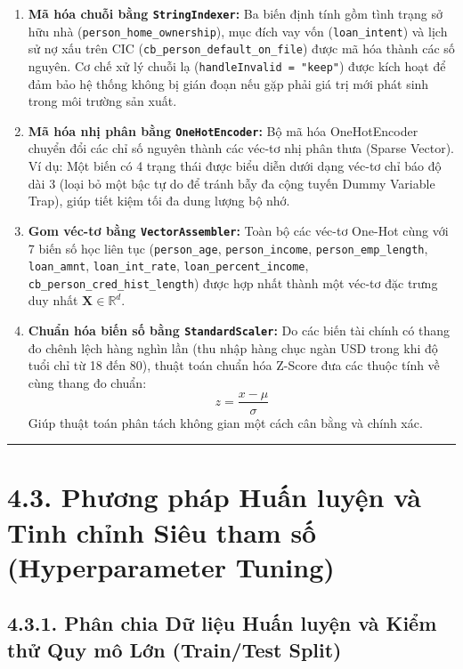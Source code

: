 \documentclass[
  13pt,
  a4paper,
]{report}
\providecommand{\tightlist}{%
  \setlength{\itemsep}{0pt}\setlength{\parskip}{0pt}}
\begin{document}
\begin{enumerate}
\def\labelenumi{\arabic{enumi}.}
\tightlist
\item
  \textbf{Mã hóa chuỗi bằng \texttt{StringIndexer}:} Ba biến định tính
  gồm tình trạng sở hữu nhà (\texttt{person\_home\_ownership}), mục đích
  vay vốn (\texttt{loan\_intent}) và lịch sử nợ xấu trên CIC
  (\texttt{cb\_person\_default\_on\_file}) được mã hóa thành các số
  nguyên. Cơ chế xử lý chuỗi lạ (\texttt{handleInvalid\ =\ "keep"}) được
  kích hoạt để đảm bảo hệ thống không bị gián đoạn nếu gặp phải giá trị
  mới phát sinh trong môi trường sản xuất.
\item
  \textbf{Mã hóa nhị phân bằng \texttt{OneHotEncoder}:} Bộ mã hóa
  OneHotEncoder chuyển đổi các chỉ số nguyên thành các véc-tơ nhị phân
  thưa (Sparse Vector). Ví dụ: Một biến có 4 trạng thái được biểu diễn
  dưới dạng véc-tơ chỉ báo độ dài 3 (loại bỏ một bậc tự do để tránh bẫy
  đa cộng tuyến Dummy Variable Trap), giúp tiết kiệm tối đa dung lượng
  bộ nhớ.
\item
  \textbf{Gom véc-tơ bằng \texttt{VectorAssembler}:} Toàn bộ các véc-tơ
  One-Hot cùng với 7 biến số học liên tục (\texttt{person\_age},
  \texttt{person\_income}, \texttt{person\_emp\_length},
  \texttt{loan\_amnt}, \texttt{loan\_int\_rate},
  \texttt{loan\_percent\_income},
  \texttt{cb\_person\_cred\_hist\_length}) được hợp nhất thành một
  véc-tơ đặc trưng duy nhất \(\mathbf{X} \in \mathbb{R}^{d}\).
\item
  \textbf{Chuẩn hóa biến số bằng \texttt{StandardScaler}:} Do các biến
  tài chính có thang đo chênh lệch hàng nghìn lần (thu nhập hàng chục
  ngàn USD trong khi độ tuổi chỉ từ 18 đến 80), thuật toán chuẩn hóa
  Z-Score đưa các thuộc tính về cùng thang đo chuẩn:
  \[z = \frac{x - \mu}{\sigma}\] Giúp thuật toán phân tách không gian
  một cách cân bằng và chính xác.
\end{enumerate}

\begin{center}\rule{0.5\linewidth}{0.5pt}\end{center}

\section{4.3. Phương pháp Huấn luyện và Tinh chỉnh Siêu tham số
(Hyperparameter
Tuning)}\label{phux1b0ux1a1ng-phuxe1p-huux1ea5n-luyux1ec7n-vuxe0-tinh-chux1ec9nh-siuxeau-tham-sux1ed1-hyperparameter-tuning}

\subsection{4.3.1. Phân chia Dữ liệu Huấn luyện và Kiểm thử Quy mô Lớn
(Train/Test
Split)}\label{phuxe2n-chia-dux1eef-liux1ec7u-huux1ea5n-luyux1ec7n-vuxe0-kiux1ec3m-thux1eed-quy-muxf4-lux1edbn-traintest-split}
\end{document}
